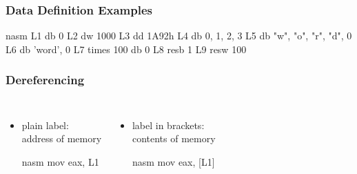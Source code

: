 \documentclass[dvipsnames]{beamer}
\begin{document}
\begin{frame}[fragile]
  \frametitle{Data Definition Examples}

  \begin{pygments}{nasm}
L1 db    0
L2 dw    1000
L3 dd    1A92h
L4 db    0, 1, 2, 3
L5 db    "w", "o", "r", "d", 0
L6 db    'word', 0
L7 times 100 db 0
L8 resb  1
L9 resw  100
  \end{pygments}
\end{frame}

\begin{frame}[fragile]
  \frametitle{Dereferencing}

  \begin{columns}[t]
    \begin{itemize}
      \item plain label:\\
        address of memory

      \medskip
      \begin{example}
        \begin{pygments}{nasm}
mov eax, L1
        \end{pygments}
      \end{example}
    \end{itemize}

    \begin{itemize}
      \item label in brackets:\\
        contents of memory

      \medskip
      \begin{example}
        \begin{pygments}{nasm}
mov eax, [L1]
        \end{pygments}
      \end{example}
    \end{itemize}
  \end{columns}
\end{frame}
\end{document}
